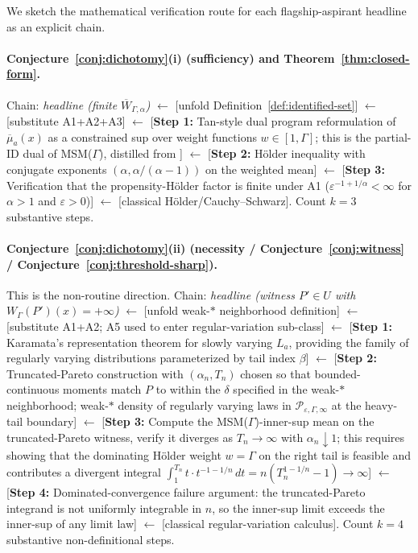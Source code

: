\documentclass[11pt]{article}
\theoremstyle{definition}
\theoremstyle{plain}
\theoremstyle{remark}
\begin{document}
We sketch the mathematical verification route for each flagship-aspirant headline as an explicit chain.

\paragraph{Conjecture~\ref{conj:dichotomy}(i) (sufficiency) and Theorem~\ref{thm:closed-form}.}
Chain: \emph{headline (finite $\overline{W}_{\Gamma,\alpha}$)} $\leftarrow$ [unfold Definition~\ref{def:identified-set}] $\leftarrow$ [substitute A1+A2+A3] $\leftarrow$ [\textbf{Step 1:} Tan-style dual program reformulation of $\overline{\mu}_{a}(x)$ as a constrained sup over weight functions $w\in[1,\Gamma]$; this is the partial-ID dual of MSM($\Gamma$), distilled from \citet{Tan2006MSM}] $\leftarrow$ [\textbf{Step 2:} Hölder inequality with conjugate exponents $(\alpha,\alpha/(\alpha-1))$ on the weighted mean] $\leftarrow$ [\textbf{Step 3:} Verification that the propensity-Hölder factor is finite under A1 ($\varepsilon^{-1+1/\alpha}<\infty$ for $\alpha>1$ and $\varepsilon>0$)] $\leftarrow$ [classical Hölder/Cauchy--Schwarz]. Count $k=3$ substantive steps.

\paragraph{Conjecture~\ref{conj:dichotomy}(ii) (necessity / Conjecture~\ref{conj:witness} / Conjecture~\ref{conj:threshold-sharp}).}
This is the non-routine direction. Chain: \emph{headline (witness $P'\in U$ with $W_{\Gamma}(P')(x)=+\infty$)} $\leftarrow$ [unfold weak-$*$ neighborhood definition] $\leftarrow$ [substitute A1+A2; A5 used to enter regular-variation sub-class] $\leftarrow$ [\textbf{Step 1:} Karamata's representation theorem \citep{Karamata1933,Resnick2007HeavyTail} for slowly varying $L_a$, providing the family of regularly varying distributions parameterized by tail index $\beta$] $\leftarrow$ [\textbf{Step 2:} Truncated-Pareto construction with $(\alpha_{n},T_{n})$ chosen so that bounded-continuous moments match $P$ to within the $\delta$ specified in the weak-$*$ neighborhood; weak-$*$ density of regularly varying laws in $\mathcal{P}_{\varepsilon,\Gamma,\infty}$ at the heavy-tail boundary] $\leftarrow$ [\textbf{Step 3:} Compute the MSM($\Gamma$)-inner-sup mean on the truncated-Pareto witness, verify it diverges as $T_{n}\to\infty$ with $\alpha_{n}\downarrow 1$; this requires showing that the dominating Hölder weight $w=\Gamma$ on the right tail is feasible and contributes a divergent integral $\int_{1}^{T_{n}} t\cdot t^{-1-1/n}\,dt = n(T_{n}^{1-1/n}-1)\to\infty$] $\leftarrow$ [\textbf{Step 4:} Dominated-convergence failure argument: the truncated-Pareto integrand is not uniformly integrable in $n$, so the inner-sup limit exceeds the inner-sup of any limit law] $\leftarrow$ [classical regular-variation calculus]. Count $k=4$ substantive non-definitional steps.
\end{document}
